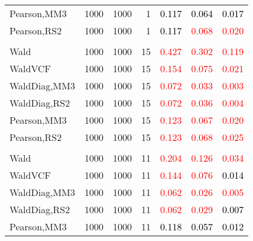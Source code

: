 \documentclass[
]{article}
\begin{document}
\begin{table}[H]
{\begin{tabular}[t]{lrrrrrr}
\hspace{1em}Pearson,MM3 & 1000 & 1000 & 1 & \textcolor{black}{0.117} & \textcolor{black}{0.064} & \textcolor{black}{0.017}\\
\hspace{1em}Pearson,RS2 & 1000 & 1000 & 1 & \textcolor{black}{0.117} & \textcolor{red}{0.068} & \textcolor{red}{0.020}\\
\addlinespace[0.3em]
\multicolumn{7}{l}{\textbf{1F 15V}}\\
\hspace{1em}Wald & 1000 & 1000 & 15 & \textcolor{red}{0.427} & \textcolor{red}{0.302} & \textcolor{red}{0.119}\\
\hspace{1em}WaldVCF & 1000 & 1000 & 15 & \textcolor{red}{0.154} & \textcolor{red}{0.075} & \textcolor{red}{0.021}\\
\hspace{1em}WaldDiag,MM3 & 1000 & 1000 & 15 & \textcolor{red}{0.072} & \textcolor{red}{0.033} & \textcolor{red}{0.003}\\
\hspace{1em}WaldDiag,RS2 & 1000 & 1000 & 15 & \textcolor{red}{0.072} & \textcolor{red}{0.036} & \textcolor{red}{0.004}\\
\hspace{1em}Pearson,MM3 & 1000 & 1000 & 15 & \textcolor{red}{0.123} & \textcolor{red}{0.067} & \textcolor{red}{0.020}\\
\hspace{1em}Pearson,RS2 & 1000 & 1000 & 15 & \textcolor{red}{0.123} & \textcolor{red}{0.068} & \textcolor{red}{0.025}\\
\addlinespace[0.3em]
\multicolumn{7}{l}{\textbf{2F 10V}}\\
\hspace{1em}Wald & 1000 & 1000 & 11 & \textcolor{red}{0.204} & \textcolor{red}{0.126} & \textcolor{red}{0.034}\\
\hspace{1em}WaldVCF & 1000 & 1000 & 11 & \textcolor{red}{0.144} & \textcolor{red}{0.076} & \textcolor{black}{0.014}\\
\hspace{1em}WaldDiag,MM3 & 1000 & 1000 & 11 & \textcolor{red}{0.062} & \textcolor{red}{0.026} & \textcolor{red}{0.005}\\
\hspace{1em}WaldDiag,RS2 & 1000 & 1000 & 11 & \textcolor{red}{0.062} & \textcolor{red}{0.029} & \textcolor{black}{0.007}\\
\hspace{1em}Pearson,MM3 & 1000 & 1000 & 11 & \textcolor{black}{0.118} & \textcolor{black}{0.057} & \textcolor{black}{0.012}\\

\end{tabular}}
\end{table}
\end{document}
